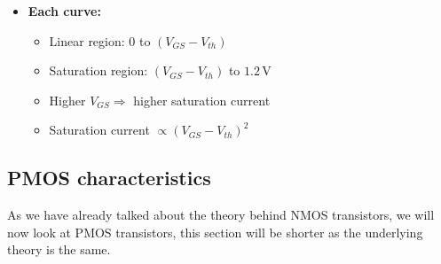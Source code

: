 \documentclass[a4paper,12pt]{article}
\begin{document}
\begin{itemize}
\begin{itemize}
    \item \textbf{Each curve:}
      \begin{itemize}
        \item Linear region: $0$ to $(V_{GS} - V_{th})$
        \item Saturation region: $(V_{GS} - V_{th})$ to $1.2\,\text{V}$
        \item Higher $V_{GS} \Rightarrow$ higher saturation current
        \item Saturation current $\propto (V_{GS} - V_{th})^2$
      \end{itemize}
  \end{itemize}
\end{itemize}



\subsection{PMOS characteristics}

As we have already talked about the theory behind NMOS transistors, we will now look at PMOS transistors, 
this section will be shorter as the underlying theory is the same.
\end{document}

